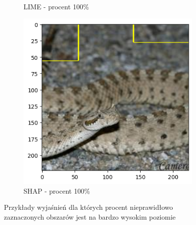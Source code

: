 \begin{figure}[h]
\begin{subfigure}[b]{0.3\textwidth}
		\caption{LIME - procent 100\%}
	\end{subfigure}
	\begin{subfigure}[b]{0.3\textwidth}
		\includegraphics[width=.9\textwidth]{img/examples/appendix/n01756291_07991_shap}
		\caption{SHAP - procent 100\%}
	\end{subfigure}
	\caption{Przykłady wyjaśnień dla których procent nieprawidłowo zaznaczonych obszarów jest na bardzo wysokim poziomie}
	\label{}
\end{figure}
